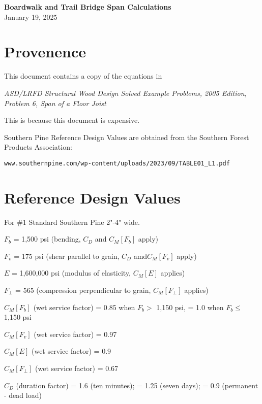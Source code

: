 \documentclass[12pt]{article}
\begin{document}
        
\begin{center}
\Large
{\LARGE  \bf Boardwalk and Trail Bridge Span Calculations}
\\[2ex]
January 19, 2025
\end{center}

\bigskip

\section{Provenence}

This document contains a copy of the equations in

\begin{center}
{\em ASD/LRFD Structural Wood Design Solved Example Problems, 2005 Edition,
Problem 6, Span of a Floor Joist}
\end{center}

This is because this document is expensive.

Southern Pine Reference Design Values are obtained from the Southern
Forest Products Association:

\begin{center}
{\tt www.southernpine.com/wp-content/uploads/2023/09/TABLE01\_L1.pdf}
\end{center}

\section{Reference Design Values}

For \#1 Standard Southern Pine 2"-4" wide.

$F_b$ = 1,500 psi (bending, $C_D$ and $C_M[F_b]$ apply)

$F_v$ = 175 psi (shear parallel to grain, $C_D$ amd$C_M[F_v]$ apply)

$E$ = 1,600,000 psi (modulus of elasticity, $C_M[E]$ applies)

$F_\perp$ = 565 (compression perpendicular to grain, $C_M[F_\perp]$ applies)

$C_M[F_b]$ (wet service factor)
    = 0.85 when $F_b >$ 1,150 psi, = 1.0 when $F_b \leq$ 1,150 psi

$C_M[F_v]$ (wet service factor) = 0.97

$C_M[E]$ (wet service factor) = 0.9

$C_M[F_\perp]$ (wet service factor) = 0.67

$C_D$ (duration factor) = 1.6 (ten minutes); = 1.25 (seven days);
                        = 0.9 (permanent - dead load)
\end{document}
